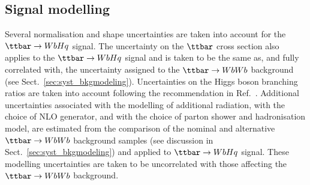\subsection{Signal modelling}
\label{sec:syst_sigmodeling}

Several normalisation and shape uncertainties are taken into account for the $\Hq$ signal.
The uncertainty on the $\ttbar$ cross section also applies to the $\Hq$ signal and is taken to be the same as, 
and fully correlated with, the uncertainty assigned to the $\ttbar \to WbWb$ background (see Sect.~\ref{sec:syst_bkgmodeling}).
Uncertainties on the Higgs boson branching ratios are taken into account
following the recommendation in Ref.~\cite{deFlorian:2016spz}.
Additional uncertainties associated with the modelling of additional radiation, with the choice of NLO generator, and
with the choice of parton shower and hadronisation model, are estimated from the comparison of the nominal
and alternative $\ttbar \to WbWb$ background samples (see discussion in Sect.~\ref{sec:syst_bkgmodeling}) and applied to $\Hq$ signal. 
These modelling uncertainties are taken to be uncorrelated with those affecting the $\ttbar \to WbWb$ background.

